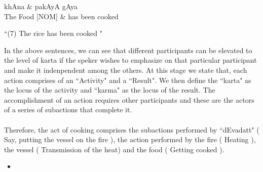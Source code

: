 \documentclass[twoside]{article}
\begin{document}
\hypertarget{fig7}{}
\begin{center}
\begin{dependency}[arc edge, arc angle=80, text only label, label style={above}]
   \begin{deptext}[column sep=1em]
      khAna \& pakAyA gAya \\
      The Food [NOM] \& has been cooked \\
   \end{deptext}
   
\end{dependency} 

 ``(7) The rice has been cooked " 
 

\end{center}
In the above sentences, we can see that different participants can be elevated to the level of karta if the speker wishes to emphasize on that particular participant and make it indenpendent among the others. 
At this stage we state that, each action comprises of an ``Activity" and a ``Result". We then define the ``karta" as the locus of the activity and ``karma" as the locus of the result. 
The accomplishment of an action requires other participants and these are the actors of a series of subactions that complete it. 
\paragraph{} Therefore, the act of cooking comprises the subactions performed by ``dEvadatt" ( Say, putting the vessel on the fire ), the action performed by the fire ( Heating ), the vessel ( Transmission of the heat) and the food ( Getting cooked ). 



\begin{itemize}
 \item 
\end{itemize}
\end{document}
